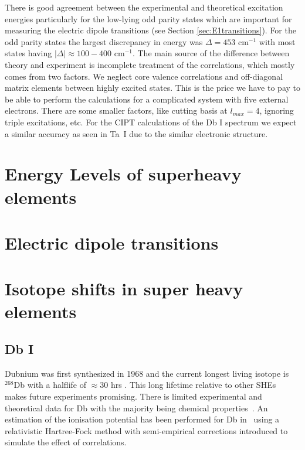 \documentclass[8pt,a4paper, twoside]{report}
\begin{document}
There is good agreement between the experimental and theoretical excitation energies particularly for the low-lying odd parity 
states which are important for measuring the electric dipole transitions (see Section \ref{sec:E1transitions}). For the odd parity
states the largest discrepancy in energy was $\Delta = 453$ cm$^{-1}$ with most states having $|\Delta| \approx 100-400$ 
cm$^{-1}$. The main source of the difference between theory and experiment is incomplete treatment of the correlations,
which mostly comes from two factors. We neglect core valence correlations and off-diagonal matrix elements between
highly excited states. This is the price we have to pay to be able to perform the calculations for a
complicated system with five external electrons. There are some smaller factors, like cutting basis at $l_{max}=4$, 
ignoring triple excitations, etc.
For the CIPT calculations of the Db I spectrum we expect a similar accuracy as seen in Ta~I due to the similar electronic structure.\\


\chapter{Energy Levels of superheavy elements}

\chapter{Electric dipole transitions}

\chapter{Isotope shifts in super heavy elements}

\section{Db I} \label{sec:DbI}

Dubnium was first synthesized in 1968 and the current longest living isotope is $^{268}$Db with a halflife of $\approx 30 $ hrs 
\cite{Schadel2012, Oganessian2005}. This long lifetime relative to other SHEs makes future experiments promising. 
There is limited experimental and theoretical data for Db with the majority being chemical properties~\cite{Schadel2012,
 Fricke1975}.  An estimation of the ionisation potential has been performed for Db in~\cite{Dzuba2016} using a relativistic 
 Hartree-Fock  method with semi-empirical corrections introduced to simulate the effect of correlations.
\end{document}
